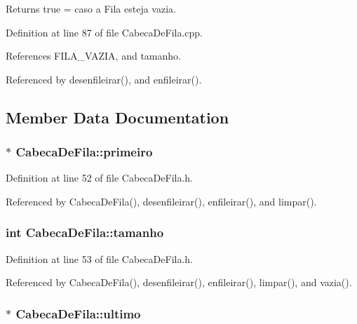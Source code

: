 \begin{DoxyReturn}{Returns}
true = caso a Fila esteja vazia. 
\end{DoxyReturn}


Definition at line 87 of file CabecaDeFila.cpp.



References FILA\_\-VAZIA, and tamanho.



Referenced by desenfileirar(), and enfileirar().



\subsection{Member Data Documentation}
\hypertarget{classCabecaDeFila_a0ba2e2fd8b989285a492a3a9d5716e00}{
\subsubsection[{primeiro}]{$\ast$ {\bf CabecaDeFila::primeiro}}}
\label{classCabecaDeFila_a0ba2e2fd8b989285a492a3a9d5716e00}


Definition at line 52 of file CabecaDeFila.h.



Referenced by CabecaDeFila(), desenfileirar(), enfileirar(), and limpar().

\hypertarget{classCabecaDeFila_a71496e069a5e360d24b91e8600a360bc}{
\subsubsection[{tamanho}]{\setlength{\rightskip}{0pt plus 5cm}int {\bf CabecaDeFila::tamanho}}}
\label{classCabecaDeFila_a71496e069a5e360d24b91e8600a360bc}


Definition at line 53 of file CabecaDeFila.h.



Referenced by CabecaDeFila(), desenfileirar(), enfileirar(), limpar(), and vazia().

\hypertarget{classCabecaDeFila_a5446294afc8bbc810363751e83fef53d}{
\subsubsection[{ultimo}]{ $\ast$ {\bf CabecaDeFila::ultimo}}}
\label{classCabecaDeFila_a5446294afc8bbc810363751e83fef53d}


